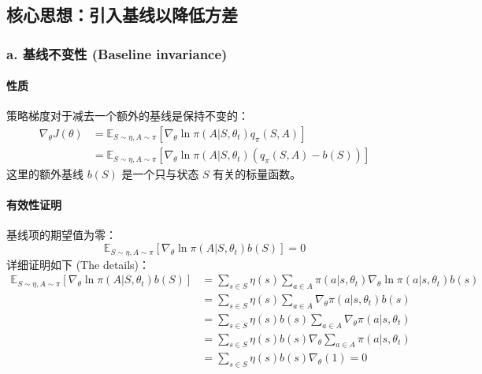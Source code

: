 \documentclass{article}
\begin{document}
\subsection*{核心思想：引入基线以降低方差}

\subsubsection*{a. 基线不变性 (Baseline invariance)}

\paragraph{性质} 策略梯度对于减去一个额外的基线是保持不变的：
\begin{align*}
    \nabla_{\theta} J(\theta) &= \mathbb{E}_{S \sim \eta, A \sim \pi} [\nabla_{\theta} \ln \pi(A|S, \theta_t) q_{\pi}(S, A)] \\
    &= \mathbb{E}_{S \sim \eta, A \sim \pi} [\nabla_{\theta} \ln \pi(A|S, \theta_t) (q_{\pi}(S, A) - b(S))]
\end{align*}
这里的额外基线 $b(S)$ 是一个只与状态 $S$ 有关的标量函数。

\paragraph{有效性证明} 基线项的期望值为零：
\[
\mathbb{E}_{S \sim \eta, A \sim \pi} [\nabla_{\theta} \ln \pi(A|S, \theta_t) b(S)] = 0
\]
详细证明如下 (The details)：
\begin{align*}
    \mathbb{E}_{S \sim \eta, A \sim \pi} [\nabla_{\theta} \ln \pi(A|S, \theta_t) b(S)] 
    &= \sum_{s \in S} \eta(s) \sum_{a \in A} \pi(a|s, \theta_t) \nabla_{\theta} \ln \pi(a|s, \theta_t) b(s) \\
    &= \sum_{s \in S} \eta(s) \sum_{a \in A} \nabla_{\theta} \pi(a|s, \theta_t) b(s) \\
    &= \sum_{s \in S} \eta(s) b(s) \sum_{a \in A} \nabla_{\theta} \pi(a|s, \theta_t) \\
    &= \sum_{s \in S} \eta(s) b(s) \nabla_{\theta} \sum_{a \in A} \pi(a|s, \theta_t) \\
    &= \sum_{s \in S} \eta(s) b(s) \nabla_{\theta} (1) = 0
\end{align*}
\end{document}
